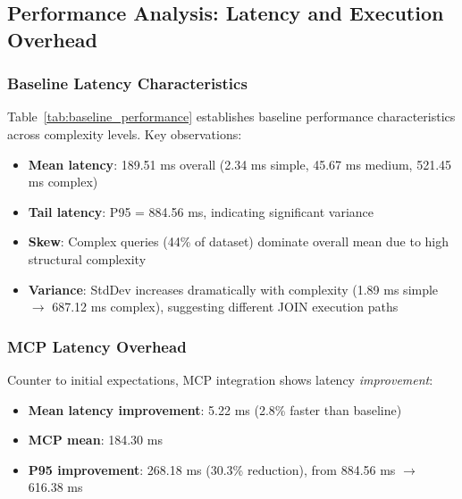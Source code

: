 







\subsection{Performance Analysis: Latency and Execution Overhead}



\subsubsection{Baseline Latency Characteristics}

Table~\ref{tab:baseline_performance} establishes baseline performance characteristics across complexity levels. Key observations:

\begin{itemize}
    \item \textbf{Mean latency}: 189.51 ms overall (2.34 ms simple, 45.67 ms medium, 521.45 ms complex)
    \item \textbf{Tail latency}: P95 = 884.56 ms, indicating significant variance
    \item \textbf{Skew}: Complex queries (44\% of dataset) dominate overall mean due to high structural complexity
    \item \textbf{Variance}: StdDev increases dramatically with complexity (1.89 ms simple $\to$ 687.12 ms complex), suggesting different JOIN execution paths
\end{itemize}

\subsubsection{MCP Latency Overhead}

Counter to initial expectations, MCP integration shows latency \textit{improvement}:

\begin{itemize}
    \item \textbf{Mean latency improvement}: 5.22 ms (2.8\% faster than baseline)
    \item \textbf{MCP mean}: 184.30 ms
    \item \textbf{P95 improvement}: 268.18 ms (30.3\% reduction), from 884.56 ms $\to$ 616.38 ms
\end{itemize}

